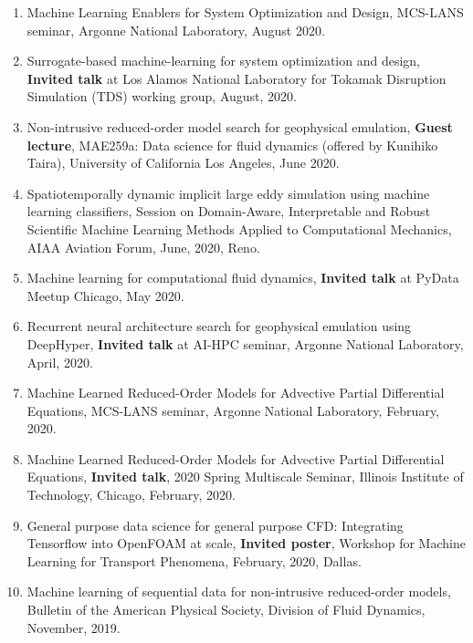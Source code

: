 \documentclass[letterpaper]{article}
\begin{document}
\begin{enumerate}
\item Machine Learning Enablers for System Optimization and Design, MCS-LANS seminar, Argonne National Laboratory, August 2020.

\item Surrogate-based machine-learning for system optimization and design, \textbf{Invited talk} at Los Alamos National Laboratory for Tokamak Disruption Simulation (TDS) working group, August, 2020.

\item Non-intrusive reduced-order model search for geophysical emulation, \textbf{Guest lecture}, MAE259a: Data science for fluid dynamics (offered by Kunihiko Taira), University of California Los Angeles, June 2020.

\item Spatiotemporally dynamic implicit large eddy simulation using machine learning classifiers, Session on Domain-Aware, Interpretable and Robust Scientific Machine Learning Methods Applied to Computational Mechanics, AIAA Aviation Forum, June, 2020, Reno. 

\item Machine learning for computational fluid dynamics, \textbf{Invited talk} at PyData Meetup Chicago, May 2020.

\item Recurrent neural architecture search for geophysical emulation using DeepHyper, \textbf{Invited talk} at AI-HPC seminar, Argonne National Laboratory, April, 2020.

\item Machine Learned Reduced-Order Models for Advective Partial Differential Equations, MCS-LANS seminar, Argonne National Laboratory, February, 2020.

\item Machine Learned Reduced-Order Models for Advective Partial Differential Equations, \textbf{Invited talk}, 2020 Spring Multiscale Seminar, Illinois Institute of Technology, Chicago, February, 2020.

\item General purpose data science for general purpose CFD: Integrating Tensorflow into OpenFOAM at scale, \textbf{Invited poster}, Workshop for Machine Learning for Transport Phenomena, February, 2020, Dallas.

\item Machine learning of sequential data for non-intrusive reduced-order models, Bulletin of the American Physical Society, Division of Fluid Dynamics, November, 2019.


\end{enumerate}
\end{document}
